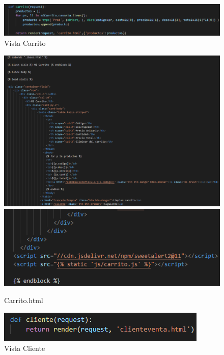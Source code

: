 \documentclass[12pt,letterpaper]{article}
\begin{document}
	\begin{figure}[H]
		\centering
		\includegraphics[scale=0.50]{Documentacion/img/def_Carrito.png}
		\caption{Vista Carrito}
	\end{figure}
	
	\begin{figure}[H]
		\centering
		\includegraphics[scale=0.70]{Documentacion/img/lineasCarrito.png}
		\includegraphics[scale=0.70]{Documentacion/img/lineasCarrito2.png}
		\caption{Carrito.html}
	\end{figure}
	
	
	\begin{figure}[H]
		\centering
		\includegraphics[scale=0.70]{Documentacion/img/def_cliente.png}
		\caption{Vista Cliente}
	\end{figure}
	
\end{document}

